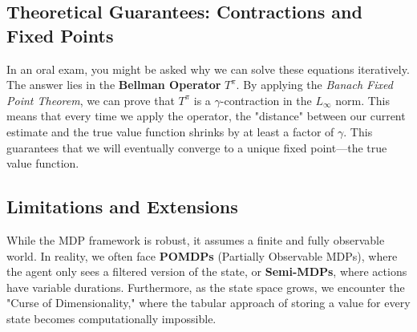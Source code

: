 \subsection{Theoretical Guarantees: Contractions and Fixed Points}
In an oral exam, you might be asked why we can solve these equations iteratively. The answer lies in the \textbf{Bellman Operator} $T^\pi$. By applying the \textit{Banach Fixed Point Theorem}, we can prove that $T^\pi$ is a $\gamma$-contraction in the $L_\infty$ norm. This means that every time we apply the operator, the "distance" between our current estimate and the true value function shrinks by at least a factor of $\gamma$. This guarantees that we will eventually converge to a unique fixed point—the true value function.

\subsection{Limitations and Extensions}
While the MDP framework is robust, it assumes a finite and fully observable world. In reality, we often face \textbf{POMDPs} (Partially Observable MDPs), where the agent only sees a filtered version of the state, or \textbf{Semi-MDPs}, where actions have variable durations. Furthermore, as the state space grows, we encounter the "Curse of Dimensionality," where the tabular approach of storing a value for every state becomes computationally impossible.
